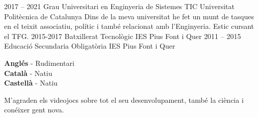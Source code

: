 \documentclass[9pt]{developercv} %
\begin{document}
\begin{entrylist}
	\entry
		{2017 -- 2021}
		{Grau Universitari en Enginyeria de Sistemes TIC}
		{Universitat Politècnica de Catalunya}
		{Dins de la meva universitat he fet un munt de tasques en el teixit associatiu, polític i també
relacionat amb l’Enginyeria. Estic cursant el TFG.}
	\entry
		{2015-2017}
		{Batxillerat Tecnològic}
		{IES Pius Font i Quer}
		{}
	\entry
		{2011 -- 2015}
		{Educació Secundaria Obligatòria}
		{IES Pius Font i Quer}
		{}
\end{entrylist}


\begin{minipage}[t]{0.3\textwidth}
	\vspace{-\baselineskip} %

	
	\textbf{Anglés} - Rudimentari\\
	\textbf{Català} - Natiu\\
	\textbf{Castellà} - Natiu
\end{minipage}
\hfill
\begin{minipage}[t]{0.3\textwidth}
	\vspace{-\baselineskip} %
	
	
   M'agraden els videojocs sobre tot el seu desenvolupament, també la ciència i conéixer gent nova.
	
\end{minipage}
\hfill

\end{document}
